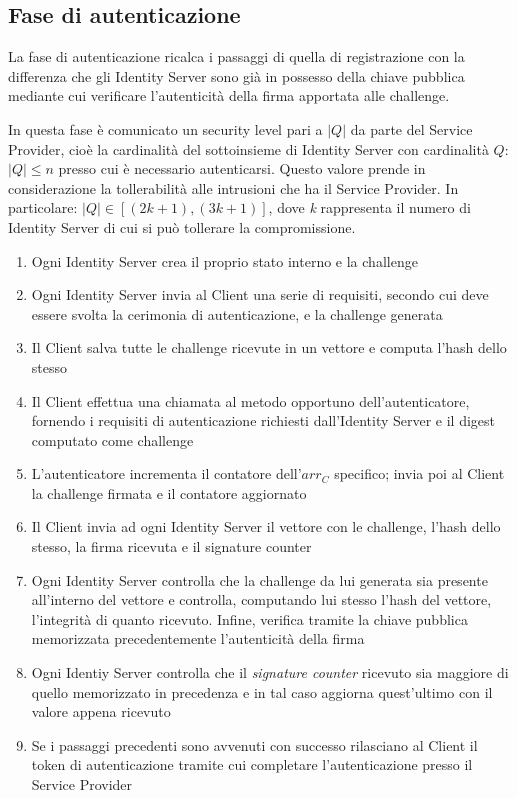 \subsection{Fase di autenticazione}
\label{autenticazione}

La fase di autenticazione ricalca i passaggi di quella di registrazione con la differenza che gli Identity Server sono già in possesso della chiave pubblica mediante cui verificare l'autenticità della firma apportata alle challenge. 

In questa fase è comunicato un security level pari a ${|Q|}$ da parte del Service Provider, cioè la cardinalità del sottoinsieme di Identity Server con cardinalità $Q:$ ${|Q|\leq n}$ presso cui è necessario autenticarsi. Questo valore prende in considerazione la tollerabilità alle intrusioni che ha il Service Provider. In particolare: ${|Q| \in [(2k+1), (3k+1)] }$, dove \emph{k} rappresenta il numero di Identity Server di cui si può tollerare la compromissione. 

\begin{enumerate}
	\item Ogni Identity Server crea il proprio stato interno e la challenge
	\item Ogni Identity Server invia al Client una serie di requisiti, secondo cui deve essere svolta la cerimonia di autenticazione, e la challenge generata
	\item Il Client salva tutte le challenge ricevute in un vettore e computa l'hash dello stesso
	\item Il Client effettua una chiamata al metodo opportuno dell'autenticatore, fornendo i requisiti di autenticazione richiesti dall'Identity Server e il digest computato come challenge
	\item L'autenticatore incrementa il contatore dell'${arr_C}$ specifico; invia poi al Client la challenge firmata e il contatore aggiornato
	\item Il Client invia ad ogni Identity Server il vettore con le challenge, l'hash dello stesso, la firma ricevuta e il signature counter
	\item Ogni Identity Server controlla che la challenge da lui generata sia presente all'interno del vettore e controlla, computando lui stesso l'hash del vettore, l'integrità di quanto ricevuto. Infine, verifica tramite la chiave pubblica memorizzata precedentemente l'autenticità della firma
	\item Ogni Identiy Server controlla che il \emph{signature counter} ricevuto sia maggiore di quello memorizzato in precedenza e in tal caso aggiorna quest'ultimo con il valore appena ricevuto
	\item Se i passaggi precedenti sono avvenuti con successo rilasciano al Client il token di autenticazione tramite cui completare l'autenticazione presso il Service Provider
\end{enumerate}
